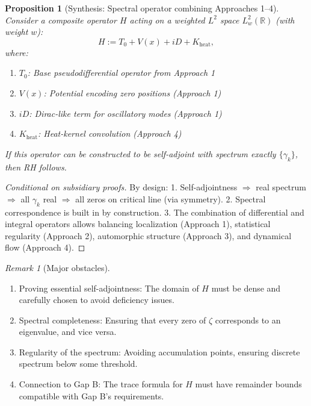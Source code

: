 \documentclass[11pt]{article}
\theoremstyle{plain}
\newtheorem{proposition}[theorem]{Proposition}
\theoremstyle{definition}
\theoremstyle{remark}
\newtheorem{remark}[theorem]{Remark}
\begin{document}
\begin{proposition}[Synthesis: Spectral operator combining Approaches 1--4]
Consider a composite operator $H$ acting on a weighted $L^2$ space $L^2_w(\mathbb{R})$ (with weight $w$):
\[
H := T_0 + V(x) + iD + K_{\text{heat}},
\]
where:
\begin{enumerate}
  \item $T_0$: Base pseudodifferential operator from Approach 1
  \item $V(x)$: Potential encoding zero positions  (Approach 1)
  \item $iD$: Dirac-like term for oscillatory modes (Approach 1)
  \item $K_{\text{heat}}$: Heat-kernel convolution (Approach 4)
\end{enumerate}
If this operator can be constructed to be self-adjoint with spectrum exactly $\{\gamma_k\}$,
then RH follows.
\end{proposition}

\begin{proof}[Conditional on subsidiary proofs]
By design:
1. Self-adjointness $\Rightarrow$ real spectrum $\Rightarrow$ all $\gamma_k$ real $\Rightarrow$ all zeros on critical line (via symmetry).
2. Spectral correspondence is built in by construction.
3. The combination of differential and integral operators allows balancing localization (Approach 1),
statistical regularity (Approach 2), automorphic structure (Approach 3), and dynamical flow (Approach 4).
\end{proof}

\begin{remark}[Major obstacles]
\begin{enumerate}
  \item Proving essential self-adjointness: The domain of $H$ must be dense and carefully chosen to avoid deficiency issues.

  \item Spectral completeness: Ensuring that every zero of $\zeta$ corresponds to an eigenvalue, and vice versa.

  \item Regularity of the spectrum: Avoiding accumulation points, ensuring discrete spectrum below some threshold.

  \item Connection to Gap B: The trace formula for $H$ must have remainder bounds compatible with Gap B's requirements.
\end{enumerate}
\end{remark}
\end{document}
